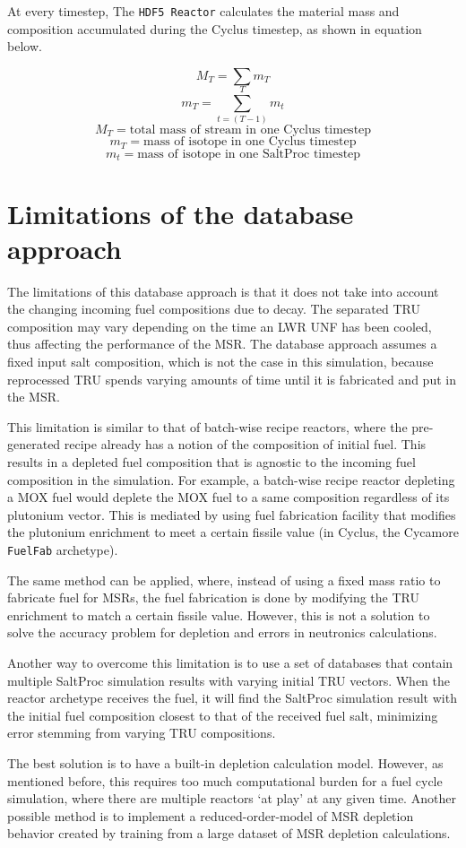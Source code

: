 At every timestep, 
The \texttt{HDF5 Reactor} calculates the material mass
and composition accumulated during the Cyclus timestep,
as shown in equation below.

\[
M_{T} = \sum m_T
\]
\[
m_{T} = \sum_{t=(T-1)}^{T} m_{t}
\]
\[
M_T = \text{total mass of stream in one Cyclus timestep}
\]
\[
m_T = \text{mass of isotope in one Cyclus timestep}
\]
\[
m_t = \text{mass of isotope in one SaltProc timestep}
\]


\section{Limitations of the database approach}
\label{sec:limit}
The limitations of this database approach is that it does not
take into account the changing incoming fuel compositions due to decay.
The separated \gls{TRU} composition may vary depending on the time
an \gls{LWR} \gls{UNF} has been cooled, thus affecting the performance
of the \gls{MSR}. The database approach assumes a fixed input salt
composition, which is not the case in this simulation, because reprocessed
\gls{TRU} spends varying amounts of time until it is fabricated and
put in the \gls{MSR}.

This limitation is similar to that of batch-wise recipe reactors, where the 
pre-generated recipe already has a notion of the composition of initial fuel.
This results in a depleted fuel composition that is agnostic to the incoming
fuel composition in the simulation. For example, a batch-wise recipe reactor
depleting a \gls{MOX} fuel would deplete the \gls{MOX} fuel to a same
composition regardless of its plutonium vector. This is mediated by using
fuel fabrication facility that modifies the plutonium enrichment to
meet a certain fissile value (in Cyclus, the Cycamore \texttt{FuelFab} archetype).

The same method can be applied, where, instead of using a fixed mass ratio
to fabricate fuel for \glspl{MSR}, the fuel fabrication is done by modifying
the \gls{TRU} enrichment to match a certain fissile value. However, this is
not a solution to solve the accuracy problem for depletion and errors
in neutronics calculations.

Another way to overcome this limitation is to use a set of databases 
that contain multiple SaltProc simulation results with varying initial \gls{TRU}
vectors. When the reactor archetype receives the fuel, it will find the
SaltProc simulation result with the initial fuel composition closest to that
of the received fuel salt, minimizing error stemming from varying
\gls{TRU} compositions.

The best solution is to have a built-in depletion calculation model. However,
as mentioned before, this requires too much computational burden for a fuel cycle simulation,
where there are multiple reactors `at play' at any given time. Another
possible method is to implement a reduced-order-model of \gls{MSR} depletion
behavior created by training from a large dataset of \gls{MSR} depletion
calculations. 